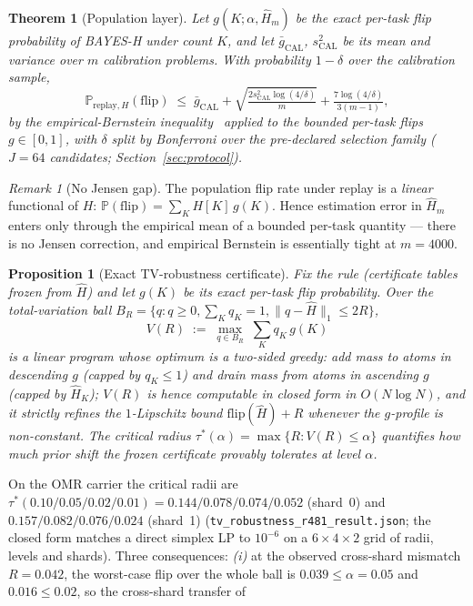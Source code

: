 \documentclass{article}
\newtheorem{theorem}{Theorem}
\newtheorem{proposition}{Proposition}
\theoremstyle{definition}
\theoremstyle{remark}
\newtheorem{remark}{Remark}
\newcommand{\flip}{\mathrm{flip}}
\newcommand{\calD}{\mathrm{CAL}}
\renewcommand{\P}{\mathbb{P}}
\begin{document}
\begin{theorem}[Population layer]
\label{thm:pop}
Let $g(K;\alpha,\widehat H_m)$ be the exact per-task flip probability of
BAYES-H under count $K$, and let
$\bar g_{\calD}$, $s^2_{\calD}$ be its mean and variance over $m$ calibration
problems. With probability $1-\delta$ over the calibration sample,
\[
\P_{\text{replay},H}(\flip) \;\le\; \bar g_{\calD}
+ \sqrt{\tfrac{2 s^2_{\calD}\log(4/\delta)}{m}}
+ \tfrac{7\log(4/\delta)}{3(m-1)},
\]
by the empirical-Bernstein inequality~\citep{maurer2009eb} applied to the
bounded per-task flips $g\in[0,1]$, with $\delta$ split by Bonferroni over the
pre-declared selection family ($J=64$ candidates; Section~\ref{sec:protocol}).
\end{theorem}
\begin{remark}[No Jensen gap]
The population flip rate under replay is a \emph{linear} functional of $H$:
$\P(\flip)=\sum_K H[K]\,g(K)$. Hence estimation error in $\widehat H_m$ enters
only through the empirical mean of a bounded per-task quantity --- there is no
Jensen correction, and empirical Bernstein is essentially tight at $m=4000$.
\end{remark}
\begin{proposition}[Exact TV-robustness certificate]
\label{prop:tv}
Fix the rule (certificate tables frozen from $\widehat H$) and let $g(K)$ be
its exact per-task flip probability. Over the total-variation ball
$B_R=\{q:q\ge0,\sum_K q_K=1,\|q-\widehat H\|_1\le 2R\}$,
\[
V(R)\;:=\;\max_{q\in B_R}\;\textstyle\sum_K q_K\,g(K)
\]
is a linear program whose optimum is a two-sided greedy: add mass to atoms in
descending $g$ (capped by $q_K\le1$) and drain mass from atoms in ascending
$g$ (capped by $\widehat H_K$); $V(R)$ is hence computable in closed form in
$O(N\log N)$, and it strictly refines the $1$-Lipschitz bound
$\flip(\widehat H)+R$ whenever the $g$-profile is non-constant. The
\emph{critical radius} $\tau^*(\alpha)=\max\{R:V(R)\le\alpha\}$ quantifies how
much prior shift the frozen certificate provably tolerates at level $\alpha$.
\end{proposition}
On the OMR carrier the critical radii are
$\tau^*(0.10/0.05/0.02/0.01)=0.144/0.078/0.074/0.052$
(shard~0) and $0.157/0.082/0.076/0.024$ (shard~1)
(\texttt{tv\_robustness\_r481\_result.json}; the closed form matches a direct
simplex LP to $10^{-6}$ on a $6\times4\times2$ grid of radii, levels and
shards). Three consequences: \emph{(i)} at the observed cross-shard mismatch
$R=0.042$, the worst-case flip over the whole ball is $0.039\le\alpha=0.05$
and $0.016\le0.02$, so the cross-shard transfer of
\end{document}
